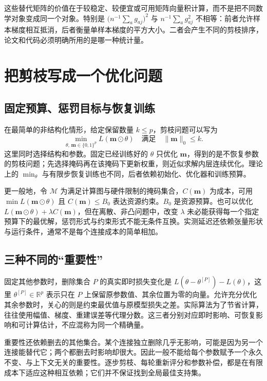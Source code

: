\documentclass[UTF8,12pt,a4paper,fontset=fandol]{ctexart}
\begin{document}
这些替代矩阵的价值在于较稳定、较便宜或可用矩阵向量积计算，而不是把不同数学对象变成同一个对象。特别是 $\bigl(n^{-1}\sum_a g_{aj}\bigr)^2$ 与 $n^{-1}\sum_a g_{aj}^2$ 不相等：前者允许样本梯度相互抵消，后者衡量单样本梯度的平方大小。二者会产生不同的剪枝排序，论文和代码必须明确所用的是哪一种统计量。

\section{把剪枝写成一个优化问题}
\label{sec:prune-optimization}

\subsection{固定预算、惩罚目标与恢复训练}
在最简单的非结构化情形，给定保留数量 $k\leq p$，剪枝问题可以写为
\begin{equation}
 \min_{\theta,\,\mathbf m\in\{0,1\}^p}L(\mathbf m\odot\theta)
 \quad\text{满足}\quad\|\mathbf m\|_0\leq k.
 \label{eq:prune-budget}
\end{equation}
这里同时选择结构和参数。固定已经训练好的 $\theta$ 只优化 $\mathbf m$，得到的是不恢复参数的剪枝问题；先选择掩码再在该掩码下更新权重，则近似求解内层连续优化。理论上的 $\min_\theta$ 与有限步恢复训练也不同，后者依赖初始化、优化器和训练预算。

更一般地，令 $\mathcal M$ 为满足计算图与硬件限制的掩码集合，$C(\mathbf m)$ 为成本，可用 $\min L(\mathbf m\odot\theta)$ 且 $C(\mathbf m)\leq B_0$ 表达资源约束。$B_0$ 是资源预算。也可以优化 $L(\mathbf m\odot\theta)+\lambda C(\mathbf m)$，但在离散、非凸问题中，改变 $\lambda$ 未必能获得每一个指定预算下的最优解，惩罚形式与约束形式不能无条件互换。实测延迟还依赖张量形状与运行条件，通常不是每个连接成本的简单相加。

\subsection{三种不同的“重要性”}
固定其他参数时，删除集合 $P$ 的真实即时损失变化是 $L(\theta-\theta^{[P]})-L(\theta)$，这里 $\theta^{[P]}\in\mathbb R^p$ 表示只在 $P$ 上保留原参数值、其余位置为零的向量。允许充分优化其余参数时，关心的则是约束最优值与原模型损失之差。实际算法为了节省计算，往往使用幅值、梯度、重建误差等代理分数。这三者分别对应即时影响、可恢复影响和可计算估计，不应混称为同一个精确量。

重要性还依赖删去的其他集合。某个连接独立删除几乎无影响，可能是因为另一个连接能替代它；两个都删去时影响却很大。因此一般不能给每个参数赋予一个永久不变、与上下文无关的重要性。逐步剪枝、每轮重新评分和参数补偿，都是在有限成本下适应这种相互依赖；它们并不保证找到全局最佳支持集。
\end{document}
